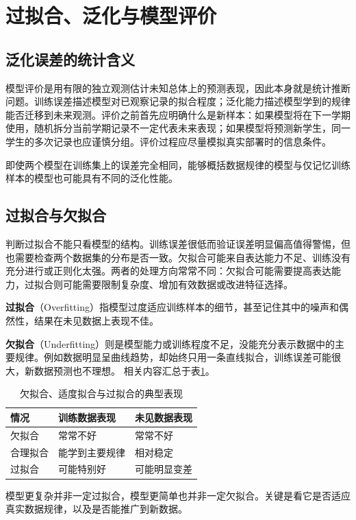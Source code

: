 \section{过拟合、泛化与模型评价}\label{ch:generalization}

\subsection{泛化误差的统计含义}

模型评价是用有限的独立观测估计未知总体上的预测表现，因此本身就是统计推断问题。训练误差描述模型对已观察记录的拟合程度；泛化能力描述模型学到的规律能否迁移到未来观测。评价之前首先应明确什么是新样本：如果模型将在下一学期使用，随机拆分当前学期记录不一定代表未来表现；如果模型将预测新学生，同一学生的多次记录也应谨慎分组。评价过程应尽量模拟真实部署时的信息条件。

即使两个模型在训练集上的误差完全相同，能够概括数据规律的模型与仅记忆训练样本的模型也可能具有不同的泛化性能。

\subsection{过拟合与欠拟合}

判断过拟合不能只看模型的结构。训练误差很低而验证误差明显偏高值得警惕，但也需要检查两个数据集的分布是否一致。欠拟合可能来自表达能力不足、训练没有充分进行或正则化太强。两者的处理方向常常不同：欠拟合可能需要提高表达能力，过拟合则可能需要限制复杂度、增加有效数据或改进特征选择。

\textbf{过拟合}（Overfitting）指模型过度适应训练样本的细节，甚至记住其中的噪声和偶然性，结果在未见数据上表现不佳。

\textbf{欠拟合}（Underfitting）则是模型能力或训练程度不足，没能充分表示数据中的主要规律。例如数据明显呈曲线趋势，却始终只用一条直线拟合，训练误差可能很大，新数据预测也不理想。
相关内容汇总于表\ref{tab:fit-regimes}。
\begin{table}[htbp]\centering
\caption{欠拟合、适度拟合与过拟合的典型表现}\label{tab:fit-regimes}
\begin{tabularx}{\textwidth}{p{22mm}XX}\toprule
情况&训练数据表现&未见数据表现\\\midrule
欠拟合&常常不好&常常不好\\
合理拟合&能学到主要规律&相对稳定\\
过拟合&可能特别好&可能明显变差\\\bottomrule
\end{tabularx}
\end{table}
模型更复杂并非一定过拟合，模型更简单也并非一定欠拟合。关键是看它是否适应真实数据规律，以及是否能推广到新数据。

